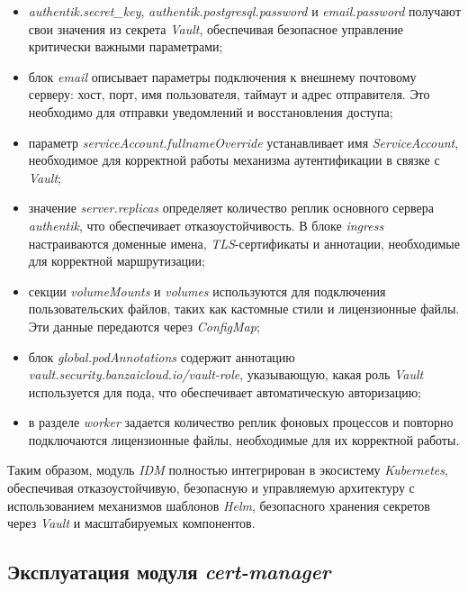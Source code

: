 \begin{itemize}
    \item \textit{authentik.secret\_key}, \textit{authentik.postgresql.password} и \textit{email.password} получают свои значения из секрета \textit{Vault}, обеспечивая безопасное управление критически важными параметрами;
    
    \item блок \textit{email} описывает параметры подключения к внешнему почтовому серверу: хост, порт, имя пользователя, таймаут и адрес отправителя. Это необходимо для отправки уведомлений и восстановления доступа;
    
    \item параметр \textit{serviceAccount.fullnameOverride} устанавливает имя \textit{ServiceAccount}, необходимое для корректной работы механизма аутентификации в связке с \textit{Vault};
    
    \item значение \textit{server.replicas} определяет количество реплик основного сервера \textit{authentik}, что обеспечивает отказоустойчивость. В блоке \textit{ingress} настраиваются доменные имена, \textit{TLS}-сертификаты и аннотации, необходимые для корректной маршрутизации;
    
    \item секции \textit{volumeMounts} и \textit{volumes} используются для подключения пользовательских файлов, таких как кастомные стили и лицензионные файлы. Эти данные передаются через \textit{ConfigMap};
    
    \item блок \textit{global.podAnnotations} содержит аннотацию \textit{vault.security.banzaicloud.io/vault-role}, указывающую, какая роль \textit{Vault} используется для пода, что обеспечивает автоматическую авторизацию;
    
    \item в разделе \textit{worker} задается количество реплик фоновых процессов и повторно подключаются лицензионные файлы, необходимые для их корректной работы.
\end{itemize}

Таким образом, модуль \textit{IDM} полностью интегрирован в экосистему \textit{Kubernetes}, обеспечивая отказоустойчивую, безопасную и управляемую архитектуру с использованием механизмов шаблонов \textit{Helm}, безопасного хранения секретов через \textit{Vault} и масштабируемых компонентов.



\subsection{Эксплуатация модуля \textit{cert-manager}}

